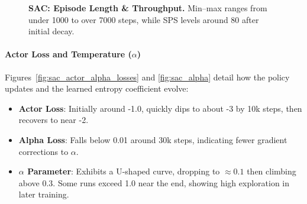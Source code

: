 \begin{figure}[htbp]
	\centering
	\quad
	\caption{\textbf{SAC: Episode Length \& Throughput.}
		Min--max ranges from under 1000 to over 7000 steps, while SPS levels around 80 after initial decay.}
	\label{fig:sac_epilen_sps}
\end{figure}

\paragraph{Actor Loss and Temperature (\(\alpha\))}
Figures~\ref{fig:sac_actor_alpha_losses} and \ref{fig:sac_alpha} detail how the policy updates and the learned entropy coefficient evolve:
\begin{itemize}
	\item \textbf{Actor Loss}: Initially around -1.0, quickly dips to about -3 by 10k steps, then recovers to near -2. 
	\item \textbf{Alpha Loss}: Falls below 0.01 around 30k steps, indicating fewer gradient corrections to \(\alpha\).
	\item \textbf{\(\alpha\) Parameter}: Exhibits a U-shaped curve, dropping to \(\approx0.1\) then climbing above 0.3. Some runs exceed 1.0 near the end, showing high exploration in later training.
\end{itemize}

